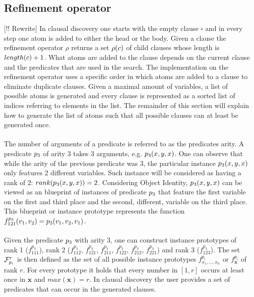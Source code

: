 \subsection{Refinement operator}
[!! Rewrite]
In clausal discovery one starts with the empty clause $\square$ and in every step one atom is added to either the head or the body.
Given a clause  the refinement operator $\rho$ returns a set $\rho(c)$ of child clauses whose length is $length(c) + 1$.
What atoms are added to the clause depends on the current clause and the predicates that are used in the search.
The implementation on the refinement operator uses a specific order in which atoms are added to a clause to eliminate duplicate clauses.
Given a maximal amount of variables, a list of possible atoms is generated and every clause is represented as a sorted list of indices referring to elements in the list.
The remainder of this section will explain how to generate the list of atoms such that all possible clauses can at least be generated once.
\\\\
The number of arguments of a predicate is referred to as the predicates arity.
A predicate $p_3$ of arity 3 takes 3 arguments, e.g. $p_3(x, y, x)$.
One can observe that while the arity of the previous predicate was 3, the particular instance $p_3(x, y, x)$ only features 2 different variables.
Such instance will be considered as having a rank of 2: $rank(p_3(x, y, x)) = 2$.
Considering Object Identity, $p_3(x, y, x)$ can be viewed as an blueprint of instances of predicate $p_3$ that feature the first variable on the first and third place and the second, different, variable on the third place.
This blueprint or instance prototype represents the function $f^{p_3}_{121}(v_1, v_2) = p_3(v_1, v_2, v_1)$.
\\\\
Given the predicate $p_3$ with arity 3, one can construct instance prototypes of rank 1 ($f^{p_3}_{111}$), rank 2 ($f^{p_3}_{112}$, $f^{p_3}_{121}$, $f^{p_3}_{211}$, $f^{p_3}_{122}$, $f^{p_3}_{212}$, $f^{p_3}_{221}$) and rank 3 ($f^{p_3}_{123}$).
The set $\mathcal{F}^r_{p_i}$ is then defined as the set of all possible instance prototypes $f^{p_i}_{x_1, ..., x_n}$ or $f^{p_i}_\mathbf{x}$ of rank $r$.
For every prototype it holds that every number in $[1, r]$ occurs at least once in $\mathbf{x}$ and $max(\mathbf{x}) = r$.
In clausal discovery the user provides a set  of predicates that can occur in the generated clauses.
